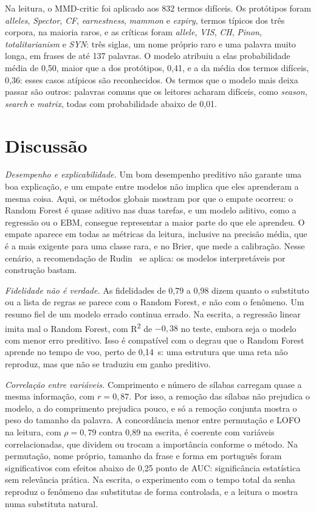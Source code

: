 \documentclass[conference]{IEEEtran}
\newcommand{\RF}{Random Forest}
\newcommand{\Rdois}{R\textsuperscript{2}}
\begin{document}
Na leitura, o MMD-critic foi aplicado aos 832 termos difíceis. Os protótipos
foram \emph{alleles}, \emph{Spector}, \emph{CF}, \emph{earnestness},
\emph{mammon} e \emph{expiry}, termos típicos dos três corpora, na maioria
raros, e as críticas foram \emph{allele}, \emph{VIS}, \emph{CH}, \emph{Pinon},
\emph{totalitarianism} e \emph{SYN}: três siglas, um nome próprio raro e uma
palavra muito longa, em frases de até 137 palavras. O modelo atribuiu a elas
probabilidade média de 0,50, maior que a dos protótipos, 0,41, e a da média dos
termos difíceis, 0,36: esses casos atípicos são reconhecidos. Os termos que o
modelo mais deixa passar são outros: palavras comuns que os leitores acharam
difíceis, como \emph{season}, \emph{search} e \emph{matrix}, todas com
probabilidade abaixo de 0,01.

\section{Discussão}

\emph{Desempenho e explicabilidade.} Um bom desempenho preditivo não garante uma
boa explicação, e um empate entre modelos não implica que eles aprenderam a
mesma coisa. Aqui, os métodos globais mostram por que o empate ocorreu: o \RF{}
é quase aditivo nas duas tarefas, e um modelo aditivo, como a regressão ou o
EBM, consegue representar a maior parte do que ele aprendeu. O empate aparece em
todas as métricas da leitura, inclusive na precisão média, que é a mais
exigente para uma classe rara, e no Brier, que mede a calibração. Nesse
cenário, a recomendação de Rudin~\cite{rudin2019stop} se aplica: os modelos
interpretáveis por construção bastam.

\emph{Fidelidade não é verdade.} As fidelidades de 0,79 a 0,98 dizem quanto o
substituto ou a lista de regras se parece com o \RF{}, e não com o fenômeno. Um
resumo fiel de um modelo errado continua errado. Na escrita, a regressão linear
imita mal o \RF{}, com \Rdois{} de $-0,38$ no teste, embora seja o modelo com
menor erro preditivo. Isso é compatível com o degrau que o \RF{} aprende no
tempo de voo, perto de 0,14~s: uma estrutura que uma reta não reproduz, mas que
não se traduziu em ganho preditivo.

\emph{Correlação entre variáveis.} Comprimento e número de sílabas carregam
quase a mesma informação, com $r = 0,87$. Por isso, a remoção das sílabas não
prejudica o modelo, a do comprimento prejudica pouco, e só a remoção conjunta
mostra o peso do tamanho da palavra. A concordância menor entre permutação e
LOFO na leitura, com $\rho = 0,79$ contra 0,89 na escrita, é coerente com
variáveis correlacionadas, que dividem ou trocam a importância conforme o
método. Na permutação, nome próprio, tamanho da frase e forma em português
foram significativos com efeitos abaixo de 0,25 ponto de AUC: significância
estatística sem relevância prática. Na escrita, o experimento com o tempo total
da senha reproduz o fenômeno das substitutas de forma controlada, e a leitura o
mostra numa substituta natural.
\end{document}
